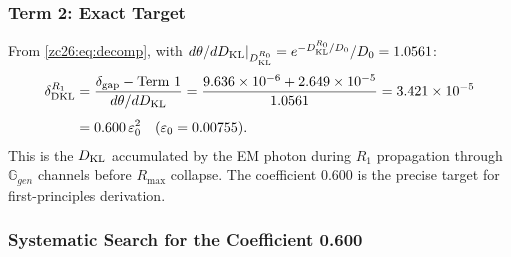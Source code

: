 \documentclass[12pt, a4paper]{article}
\begin{document}
\subsubsection{Term 2: Exact Target}

\begin{derivedbox}[title={FIND-ZC26-01: Exact Value of
  $\delta_{\rm DKL}^{R_1}$}]
From \eqref{zc26:eq:decomp}, with
$d\theta/dD_{\rm KL}|_{D_{\rm KL}^{R_0}} = e^{-D_{\rm KL}^{R_0}/D_0}/D_0
= 1.0561$:
\begin{align}
  \delta_{\rm DKL}^{R_1}
  &= \frac{\delta_{\rm gap} - \text{Term~1}}{d\theta/dD_{\rm KL}}
   = \frac{9.636\times10^{-6} + 2.649\times10^{-5}}{1.0561}
   = 3.421\times10^{-5} \\[4pt]
  &= 0.600\,\varepsilon_0^2
    \quad (\varepsilon_0 = 0.00755).
\end{align}
This is the $D_{\rm KL}$ accumulated by the EM photon during
$R_1$ propagation through $\mathbb{G}_{gen}$ channels before
$R_{\max}$ collapse.
The coefficient $0.600$ is the precise target for first-principles
derivation.
\end{derivedbox}

\subsubsection{Systematic Search for the Coefficient 0.600}
\end{document}
